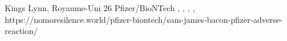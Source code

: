           {Kings Lynn, Royaume-Uni}
          {26}
          {Pfizer/BioNTech}
          {}
          {
            ,
            ,
            ,
            ,
          }
          {https://nomoresilence.world/pfizer-biontech/sam-james-bacon-pfizer-adverse-reaction/}


